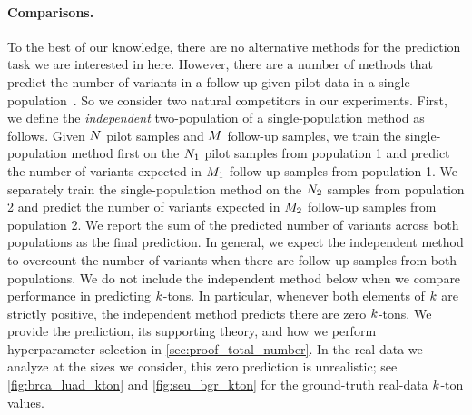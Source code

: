 \paragraph{Comparisons.} To the best of our knowledge, there are no alternative methods for the prediction task we are interested in here. However, there are a number of methods that predict the number of variants in a follow-up given pilot data in a single population~\citep{Masoero2022, chakraborty2019using,gravel2014predicting}. So we consider two natural competitors in our experiments. First, we define the \emph{independent} two-population  of a single-population method as follows. Given $\vecsamplesize$ pilot samples and $\vecfuturesamplesize$ follow-up samples, we train the single-population method first on the $N_{1}$ pilot samples from population 1 and predict the number of variants expected in $M_{1}$ follow-up samples from population 1. We separately train the single-population method on the $N_{2}$ samples from population 2 and predict the number of variants expected in $M_{2}$ follow-up samples from population 2. We report the sum of the predicted number of variants across both populations as the final prediction. 
In general, we expect the independent method to overcount the number of variants when there are follow-up samples from both populations. We do not include the independent method below when we compare performance in predicting $\vecoccurrence$-tons. In particular, whenever both elements of $\vecoccurrence$ are strictly positive, the independent method predicts there are zero $\vecoccurrence$-tons. We provide the prediction, its supporting theory, and how we perform hyperparameter selection in \cref{sec:proof_total_number}. In the real data we analyze at the sizes we consider, this zero prediction is unrealistic; see \cref{fig:brca_luad_kton} and \cref{fig:seu_bgr_kton} for the ground-truth real-data $\vecoccurrence$-ton values. %



